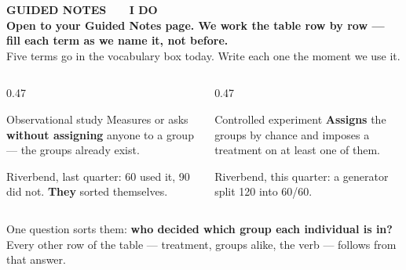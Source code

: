 \documentclass[aspectratio=169, 11pt]{beamer}
\newcommand{\redink}[1]{{\color{redacc}\bfseries #1}}
\begin{document}
{
\begin{frame}[plain]
  \vspace{1.8cm}\hspace{0.8cm}%
  \begin{minipage}{0.86\textwidth}
    {\color{goldacc}\bfseries\small GUIDED NOTES \ \textbullet\ \ I DO}\\[0.7cm]
    {\color{white}\bfseries\Large Open to your Guided Notes page. We work the table row by
    row --- fill each term as we name it, not before.}\\[0.9cm]
    {\color{frostmid}\small Five terms go in the vocabulary box today. Write each one the
    moment we use it.}
  \end{minipage}
\end{frame}
}

\begin{frame}[t, plain]
  \vspace{4pt}
  \begin{columns}[t]
    \begin{column}{0.47\textwidth}
      \begin{block}{Observational study}
        Measures or asks \textbf{without assigning} anyone to a group --- the groups already
        exist.
      \end{block}
      \vspace{4pt}
      {\small Riverbend, last quarter: 60 used it, 90 did not. \textbf{They} sorted themselves.}
    \end{column}
    \begin{column}{0.47\textwidth}
      \begin{block}{Controlled experiment}
        \textbf{Assigns} the groups by chance and imposes a treatment on at least one of them.
      \end{block}
      \vspace{4pt}
      {\small Riverbend, this quarter: a generator split 120 into 60/60.}
    \end{column}
  \end{columns}
  \vspace{12pt}
  \begin{center}
    {\large One question sorts them: \redink{who decided which group each individual is in?}}\\[6pt]
    {\small\color{slate} Every other row of the table --- treatment, groups alike, the verb ---
    follows from that answer.}
  \end{center}
\end{frame}
\end{document}
